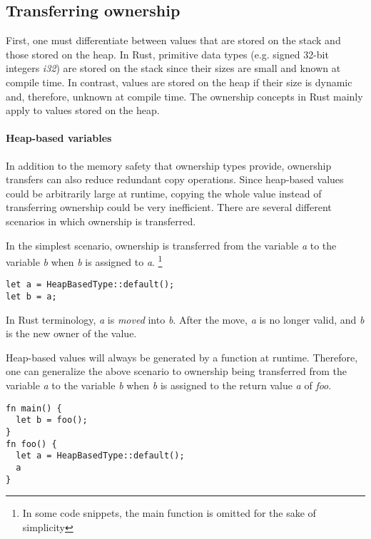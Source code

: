 \documentclass[sigplan,11pt,nonacm]{acmart}
\begin{document}
\subsection{Transferring ownership}
\label{sec:rust-transferring-ownership}

First, one must differentiate between values that are stored on the stack and those stored on the heap.
In Rust, primitive data types (e.g. signed 32-bit integers \emph{i32}) are stored on the stack since their sizes are small and known at compile time.
In contrast, values are stored on the heap if their size is dynamic and, therefore, unknown at compile time.
The ownership concepts in Rust mainly apply to values stored on the heap.

\paragraph{Heap-based variables}

In addition to the memory safety that ownership types provide, ownership transfers can also reduce redundant copy operations.
Since heap-based values could be arbitrarily large at runtime, copying the whole value instead of transferring ownership could be very inefficient.
There are several different scenarios in which ownership is transferred.

In the simplest scenario, ownership is transferred from the variable \emph{a} to the variable \emph{b} when \emph{b} is assigned to \emph{a}.
\footnote{In some code snippets, the main function is omitted for the sake of simplicity}

\begin{lstlisting}
let a = HeapBasedType::default();
let b = a;
\end{lstlisting}
In Rust terminology, \emph{a} is \emph{moved} into \emph{b}.
After the move, \emph{a} is no longer valid, and \emph{b} is the new owner of the value.

Heap-based values will always be generated by a function at runtime.
Therefore, one can generalize the above scenario to ownership being transferred from the variable \emph{a} to the variable \emph{b} when \emph{b} is assigned to the return value \emph{a} of \emph{foo}.
\begin{lstlisting}
fn main() {
  let b = foo();
}
fn foo() {
  let a = HeapBasedType::default();
  a
}
\end{lstlisting}
\end{document}
